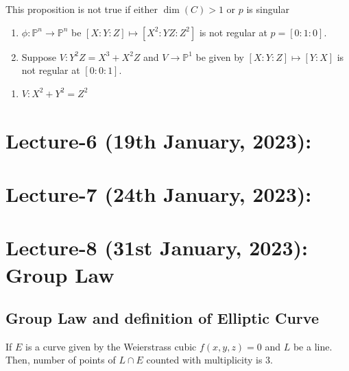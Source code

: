 \documentclass[oneside, 12pt, ]{scrbook}
\newcommand{\PP}{\mathbb{P}}
\theoremstyle{theorem}
\begin{document}
\begin{remark}
This proposition is not true if either $\dim(C) > 1$ or $p$ is singular 
\begin{enumerate}
\item $\phi: \PP^n \rightarrow \PP^n$ be $[X:Y:Z] \mapsto [X^2 : YZ : Z^2]$ is not regular at $p = [0:1:0]$.
\item Suppose $V : Y^2 Z = X^3 + X^2 Z$ and $V \rightarrow \PP^1$ be given by $[X:Y:Z] \mapsto [Y:X]$ is not regular at $[0:0:1]$.
\end{enumerate}
\end{remark}

\begin{example}
\begin{enumerate}
\item $V: X^2 + Y^2 = Z^2$
\end{enumerate}
\end{example}


\chapter{Lecture-6 (19th January, 2023):}


\chapter{Lecture-7 (24th January, 2023):}

\chapter{Lecture-8 (31st January, 2023): Group Law}

\section{Group Law and definition of Elliptic Curve}


\begin{proposition}
If $E$ is a curve given by the Weierstrass cubic $f(x,y,z)=0$ and $L$ be a line. Then, number of points of $L \cap E$ counted with multiplicity is $3$.
\end{proposition}
\end{document}
